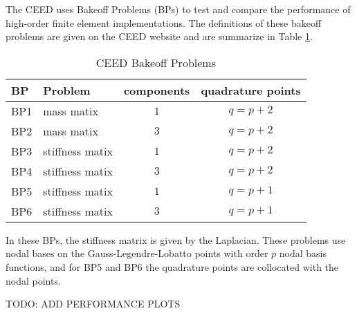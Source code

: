 The CEED uses Bakeoff Problems (BPs) to test and compare the performance of high-order finite element implementations.
The definitions of these bakeoff problems are given on the CEED website \cite{ceed-bps} and are summarize in Table \ref{table:ceedbps}.

\begin{table}[ht!]
\begin{center}
\begin{tabular}{l l c c}
  \toprule
  BP  & Problem         & components & quadrature points  \\
  \toprule
  BP1 & mass matix      & $1$        & $q = p + 2$        \\
  BP2 & mass matix      & $3$        & $q = p + 2$        \\
  \midrule
  BP3 & stiffness matix & $1$        & $q = p + 2$        \\
  BP4 & stiffness matix & $3$        & $q = p + 2$        \\
  \midrule
  BP5 & stiffness matix & $1$        & $q = p + 1$        \\
  BP6 & stiffness matix & $3$        & $q = p + 1$        \\
  \bottomrule
\end{tabular}
\end{center}
\caption{CEED Bakeoff Problems}
\label{table:ceedbps}
\end{table}

In these BPs, the stiffness matrix is given by the Laplacian.
These problems use nodal bases on the Gauss-Legendre-Lobatto points with order $p$ nodal basis functions, and for BP5 and BP6 the quadrature points are collocated with the nodal points.

TODO: ADD PERFORMANCE PLOTS
